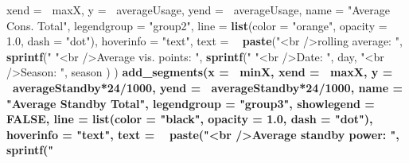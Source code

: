 \documentclass[
]{book}
\newenvironment{Shaded}{\begin{snugshade}}{\end{snugshade}}
\newcommand{\DataTypeTok}[1]{\textcolor[rgb]{0.13,0.29,0.53}{#1}}
\newcommand{\DecValTok}[1]{\textcolor[rgb]{0.00,0.00,0.81}{#1}}
\newcommand{\FloatTok}[1]{\textcolor[rgb]{0.00,0.00,0.81}{#1}}
\newcommand{\KeywordTok}[1]{\textcolor[rgb]{0.13,0.29,0.53}{\textbf{#1}}}
\newcommand{\NormalTok}[1]{#1}
\newcommand{\OperatorTok}[1]{\textcolor[rgb]{0.81,0.36,0.00}{\textbf{#1}}}
\newcommand{\OtherTok}[1]{\textcolor[rgb]{0.56,0.35,0.01}{#1}}
\newcommand{\StringTok}[1]{\textcolor[rgb]{0.31,0.60,0.02}{#1}}
\let\oldShaded\Shaded
\let\endoldShaded\endShaded
\renewenvironment{Shaded}{\footnotesize\oldShaded}{\endoldShaded}
\begin{document}
\begin{Shaded}
\begin{Highlighting}[]
{{{{{{{{{{{{{{{{{{{{{{{{{{{{{{{{{{{{{{{{{{{{               \DataTypeTok{xend =} \OperatorTok{~}\NormalTok{maxX,}
               \DataTypeTok{y =} \OperatorTok{~}\NormalTok{averageUsage,}
               \DataTypeTok{yend =} \OperatorTok{~}\NormalTok{averageUsage,}
               \DataTypeTok{name =} \StringTok{"Average Cons. Total"}\NormalTok{,}
               \DataTypeTok{legendgroup =} \StringTok{"group2"}\NormalTok{,}
               \DataTypeTok{line =} \KeywordTok{list}\NormalTok{(}\DataTypeTok{color =} \StringTok{"orange"}\NormalTok{, }\DataTypeTok{opacity =} \FloatTok{1.0}\NormalTok{, }\DataTypeTok{dash =} \StringTok{"dot"}\NormalTok{),}
               \DataTypeTok{hoverinfo =} \StringTok{"text"}\NormalTok{,}
               \DataTypeTok{text =} \OperatorTok{~}\StringTok{ }\KeywordTok{paste}\NormalTok{(}\StringTok{"<br />rolling average:        "}\NormalTok{, }\KeywordTok{sprintf}\NormalTok{(}\StringTok{"%
                              \StringTok{"<br />Average vis. points: "}\NormalTok{, }\KeywordTok{sprintf}\NormalTok{(}\StringTok{"%
                              \StringTok{"<br />Date:                        "}\NormalTok{, day,}
                              \StringTok{"<br />Season:                   "}\NormalTok{, season}
\NormalTok{               )}
\NormalTok{  ) }\OperatorTok{%
\StringTok{  }\KeywordTok{add_segments}\NormalTok{(}\DataTypeTok{x =} \OperatorTok{~}\NormalTok{minX,}
               \DataTypeTok{xend =} \OperatorTok{~}\NormalTok{maxX,}
               \DataTypeTok{y =} \OperatorTok{~}\NormalTok{averageStandby}\OperatorTok{*}\DecValTok{24}\OperatorTok{/}\DecValTok{1000}\NormalTok{,}
               \DataTypeTok{yend =} \OperatorTok{~}\NormalTok{averageStandby}\OperatorTok{*}\DecValTok{24}\OperatorTok{/}\DecValTok{1000}\NormalTok{,}
               \DataTypeTok{name =} \StringTok{"Average Standby Total"}\NormalTok{,}
               \DataTypeTok{legendgroup =} \StringTok{"group3"}\NormalTok{,}
               \DataTypeTok{showlegend =} \OtherTok{FALSE}\NormalTok{,}
               \DataTypeTok{line =} \KeywordTok{list}\NormalTok{(}\DataTypeTok{color =} \StringTok{"black"}\NormalTok{, }\DataTypeTok{opacity =} \FloatTok{1.0}\NormalTok{, }\DataTypeTok{dash =} \StringTok{"dot"}\NormalTok{),}
               \DataTypeTok{hoverinfo =} \StringTok{"text"}\NormalTok{,}
               \DataTypeTok{text =} \OperatorTok{~}\StringTok{ }\KeywordTok{paste}\NormalTok{(}\StringTok{"<br />Average standby power:          "}\NormalTok{, }\KeywordTok{sprintf}\NormalTok{(}\StringTok{"%
}}}}}}}}}}}}}}}}}}}}}}}}}}}}}}}}}}}}}}}}}}}}}}}}
\end{Highlighting}
\end{Shaded}
\end{document}
